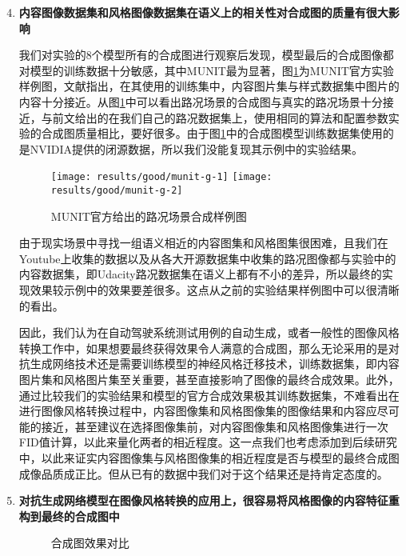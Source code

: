 \begin{enumerate}[itemindent=40pt, listparindent = 0.7cm, label={发现\arabic*:}]
    \setcounter{enumi}{3}
    \item \textbf{内容图像数据集和风格图像数据集在语义上的相关性对合成图的质量有很大影响}
    
    我们对实验的8个模型所有的合成图进行观察后发现，模型最后的合成图像都对模型的训练数据十分敏感，其中MUNIT最为显著，图\ref{fig:g-munit}为MUNIT官方实验样例图，文献\cite{MUNIT}指出，在其使用的训练集中，内容图片集与样式数据集中图片的内容十分接近。从图\ref{fig:g-munit}中可以看出路况场景的合成图与真实的路况场景十分接近，与前文给出的在我们自己的路况数据集上，使用相同的算法和配置参数实验的合成图质量相比，要好很多。由于图\ref{fig:g-munit}中的合成图模型训练数据集使用的是NVIDIA提供的闭源数据，所以我们没能复现其示例中的实验结果。
    
    \begin{figure}[]
        \centering
        \texttt{[image: results/good/munit-g-1]}
        \texttt{[image: results/good/munit-g-2]}
        \caption{MUNIT官方给出的路况场景合成样例图}
        \label{fig:g-munit}
    \end{figure}

    由于现实场景中寻找一组语义相近的内容图集和风格图集很困难，且我们在Youtube上收集的数据以及从各大开源数据集中收集的路况图像都与实验中的内容数据集，即Udacity路况数据集在语义上都有不小的差异，所以最终的实现效果较示例中的效果要差很多。这点从之前的实验结果样例图中可以很清晰的看出。 

    因此，我们认为在自动驾驶系统测试用例的自动生成，或者一般性的图像风格转换工作中，如果想要最终获得效果令人满意的合成图，那么无论采用的是对抗生成网络技术还是需要训练模型的神经风格迁移技术，训练数据集，即内容图片集和风格图片集至关重要，甚至直接影响了图像的最终合成效果。此外，通过比较我们的实验结果和模型的官方合成效果极其训练数据集，不难看出在进行图像风格转换过程中，内容图像集和风格图像集的图像结果和内容应尽可能的接近，甚至建议在选择图像集前，对内容图像集和风格图像集进行一次FID值计算，以此来量化两者的相近程度。这一点我们也考虑添加到后续研究中，以此来证实内容图像集与风格图像集的相近程度是否与模型的最终合成图成像品质成正比。但从已有的数据中我们对于这个结果还是持肯定态度的。

    \item \textbf{对抗生成网络模型在图像风格转换的应用上，很容易将风格图像的内容特征重构到最终的合成图中}
    
    \begin{figure}[h]
        \centering
        \caption{合成图效果对比}
        \label{fig:new}
    \end{figure}


\end{enumerate}
